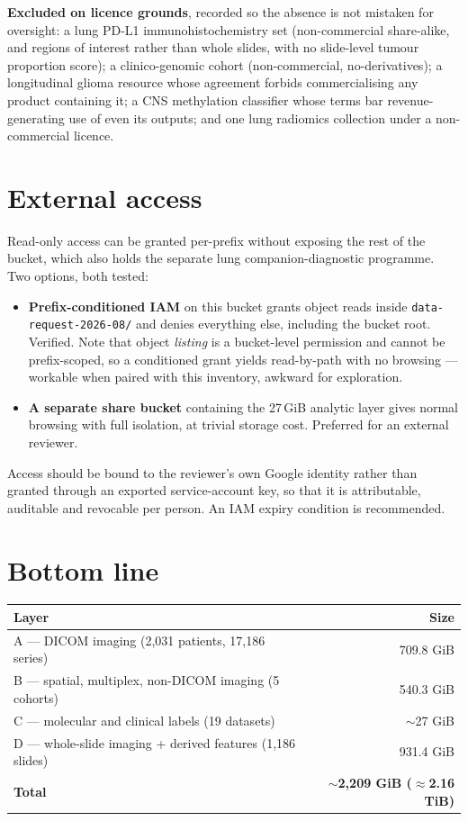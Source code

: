 \documentclass[11pt,a4paper]{article}
\begin{document}
\noindent
\textbf{Excluded on licence grounds}, recorded so the absence is not mistaken for
oversight: a lung PD-L1 immunohistochemistry set (non-commercial share-alike, and regions
of interest rather than whole slides, with no slide-level tumour proportion score); a
clinico-genomic cohort (non-commercial, no-derivatives); a longitudinal glioma resource
whose agreement forbids commercialising any product containing it; a CNS methylation
classifier whose terms bar revenue-generating use of even its outputs; and one lung
radiomics collection under a non-commercial licence.

\section{External access}

Read-only access can be granted per-prefix without exposing the rest of the bucket, which
also holds the separate lung companion-diagnostic programme. Two options, both tested:

\begin{itemize}[leftmargin=1.4em,nosep]
\item \textbf{Prefix-conditioned IAM} on this bucket grants object reads inside
\texttt{data-request-2026-08/} and denies everything else, including the bucket root.
Verified. Note that object \emph{listing} is a bucket-level permission and cannot be
prefix-scoped, so a conditioned grant yields read-by-path with no browsing --- workable
when paired with this inventory, awkward for exploration.
\item \textbf{A separate share bucket} containing the 27\,GiB analytic layer gives normal
browsing with full isolation, at trivial storage cost. Preferred for an external reviewer.
\end{itemize}

\noindent
Access should be bound to the reviewer's own Google identity rather than granted through
an exported service-account key, so that it is attributable, auditable and revocable per
person. An IAM expiry condition is recommended.

\section*{Bottom line}

\begin{center}
\begin{tabular}{@{}lr@{}}
\toprule
Layer & Size \\
\midrule
A --- DICOM imaging (2{,}031 patients, 17{,}186 series) & 709.8 GiB \\
B --- spatial, multiplex, non-DICOM imaging (5 cohorts) & 540.3 GiB \\
C --- molecular and clinical labels (19 datasets) & $\sim$27 GiB \\
D --- whole-slide imaging + derived features (1{,}186 slides) & 931.4 GiB \\
\midrule
\textbf{Total} & \textbf{$\sim$2{,}209 GiB ($\approx$2.16 TiB)} \\
\bottomrule
\end{tabular}
\end{center}
\end{document}
